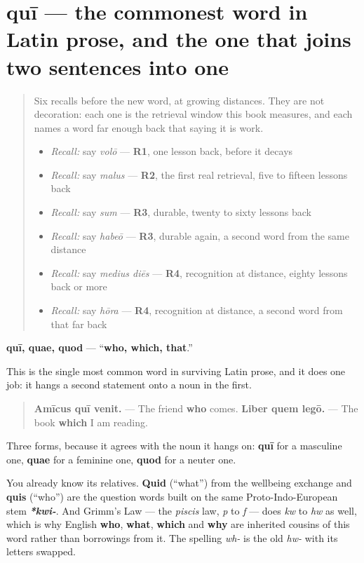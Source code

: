 \section[quī, quae, quod]{quī — the commonest word in Latin prose, and the one that joins two sentences into one}

\label{lesson:LA-C49-qui}



\begin{quote}
Six recalls before the new word, at growing distances. They are not decoration: each one is the retrieval window this book measures, and each names a word far enough back that saying it is work.

\begin{itemize}
\raggedright
  \item \emph{Recall:} say \emph{volō} — \textbf{R1}, one lesson back, before it decays
  \item \emph{Recall:} say \emph{malus} — \textbf{R2}, the first real retrieval, five to fifteen lessons back
  \item \emph{Recall:} say \emph{sum} — \textbf{R3}, durable, twenty to sixty lessons back
  \item \emph{Recall:} say \emph{habeō} — \textbf{R3}, durable again, a second word from the same distance
  \item \emph{Recall:} say \emph{medius diēs} — \textbf{R4}, recognition at distance, eighty lessons back or more
  \item \emph{Recall:} say \emph{hōra} — \textbf{R4}, recognition at distance, a second word from that far back
\end{itemize}
\end{quote}

\begin{cousinweb}
\textbf{quī, quae, quod} — \textquotedblleft{}\textbf{who, which, that}.\textquotedblright{}

This is the single most common word in surviving Latin prose, and it does one job: it hangs a second statement onto a noun in the first.

\begin{quote}
\textbf{Amīcus quī venit.} — The friend \textbf{who} comes. \textbf{Liber quem legō.} — The book \textbf{which} I am reading.
\end{quote}

Three forms, because it agrees with the noun it hangs on: \textbf{quī} for a masculine one, \textbf{quae} for a feminine one, \textbf{quod} for a neuter one.

You already know its relatives. \textbf{Quid} (\textquotedblleft{}what\textquotedblright{}) from the wellbeing exchange and \textbf{quis} (\textquotedblleft{}who\textquotedblright{}) are the question words built on the same Proto-Indo-European stem \emph{\textbf{*kwi-}}. And Grimm's Law — the \emph{piscis} law, \emph{p} to \emph{f} — does \emph{kw} to \emph{hw} as well, which is why English \textbf{who}, \textbf{what}, \textbf{which} and \textbf{why} are inherited cousins of this word rather than borrowings from it. The spelling \emph{wh-} is the old \emph{hw-} with its letters swapped.
\end{cousinweb}

